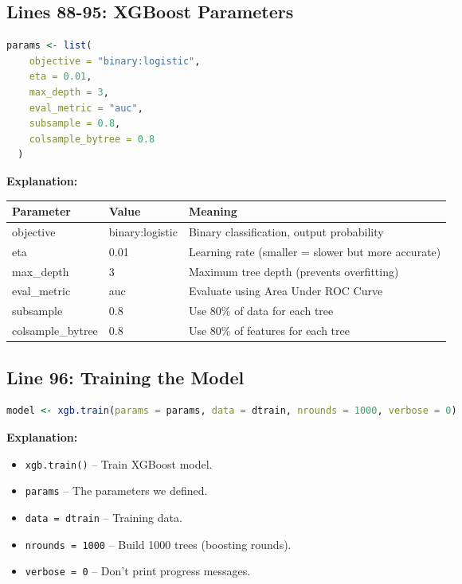 \documentclass[12pt,a4paper]{article}
\begin{document}
\subsection{Lines 88-95: XGBoost Parameters}

\begin{lstlisting}[language=R]
  params <- list(
    objective = "binary:logistic",
    eta = 0.01,
    max_depth = 3,
    eval_metric = "auc",
    subsample = 0.8,
    colsample_bytree = 0.8
  )
\end{lstlisting}

\textbf{Explanation:}

\begin{table}[h]
\centering
\begin{tabular}{@{}lll@{}}
\toprule
\textbf{Parameter} & \textbf{Value} & \textbf{Meaning} \\ \midrule
objective & binary:logistic & Binary classification, output probability \\
eta & 0.01 & Learning rate (smaller = slower but more accurate) \\
max\_depth & 3 & Maximum tree depth (prevents overfitting) \\
eval\_metric & auc & Evaluate using Area Under ROC Curve \\
subsample & 0.8 & Use 80\% of data for each tree \\
colsample\_bytree & 0.8 & Use 80\% of features for each tree \\ \bottomrule
\end{tabular}
\end{table}

\subsection{Line 96: Training the Model}

\begin{lstlisting}[language=R]
  model <- xgb.train(params = params, data = dtrain, nrounds = 1000, verbose = 0)
\end{lstlisting}

\textbf{Explanation:}
\begin{itemize}
    \item \texttt{xgb.train()} -- Train XGBoost model.
    \item \texttt{params} -- The parameters we defined.
    \item \texttt{data = dtrain} -- Training data.
    \item \texttt{nrounds = 1000} -- Build 1000 trees (boosting rounds).
    \item \texttt{verbose = 0} -- Don't print progress messages.
\end{itemize}
\end{document}
